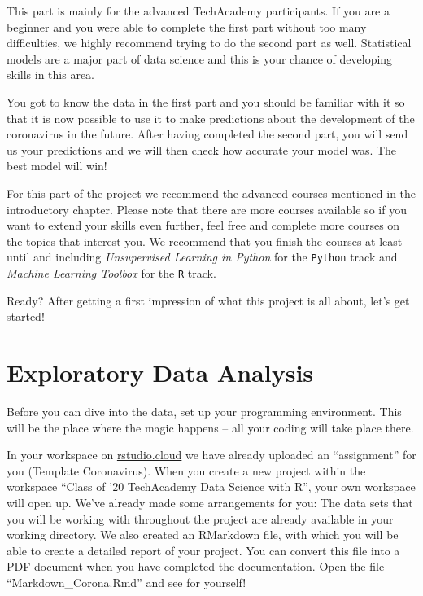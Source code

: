 \documentclass[
  11pt,
]{article}
\newenvironment{tips}[1]
  {
  \begin{itemize}
  \footnotesize
  \renewcommand{\labelitemi}{
    \raisebox{-.7\height}[0pt][0pt]{
      {\setkeys{Gin}{width=3em,keepaspectratio}
        \texttt{[image: images/\#1.png]}}
    }
  }
  \setlength{\fboxsep}{1em}
  \begin{rbox}
  \item
  }
  {
  \end{rbox}
  \end{itemize}
  }
\begin{document}
This part is mainly for the advanced TechAcademy participants. If you are a beginner and you were able to complete the first part without too many difficulties, we highly recommend trying to do the second part as well. Statistical models are a major part of data science and this is your chance of developing skills in this area.

You got to know the data in the first part and you should be familiar with it so that it is now possible to use it to make predictions about the development of the coronavirus in the future. After having completed the second part, you will send us your predictions and we will then check how accurate your model was. The best model will win!

For this part of the project we recommend the advanced courses mentioned in the introductory chapter. Please note that there are more courses available so if you want to extend your skills even further, feel free and complete more courses on the topics that interest you. We recommend that you finish the courses at least until and including \emph{Unsupervised Learning in Python} for the \texttt{Python} track and \emph{Machine Learning Toolbox} for the \texttt{R} track.

Ready? After getting a first impression of what this project is all about, let's get started!

\newpage

\hypertarget{exploratory-data-analysis}{%
\section{Exploratory Data Analysis}\label{exploratory-data-analysis}}

Before you can dive into the data, set up your programming environment. This will be the place where the magic happens -- all your coding will take place there.

\begin{tips}r

In your workspace on \href{https://rstudio.cloud/projects}{rstudio.cloud} we have already uploaded an ``assignment'' for you (Template Coronavirus). When you create a new project within the workspace ``Class of '20 \textbar{} TechAcademy \textbar{} Data Science with R'', your own workspace will open up. We've already made some arrangements for you: The data sets that you will be working with throughout the project are already available in your working directory. We also created an RMarkdown file, with which you will be able to create a detailed report of your project. You can convert this file into a PDF document when you have completed the documentation. Open the file ``Markdown\_Corona.Rmd'' and see for yourself!

\end{tips}
\end{document}
